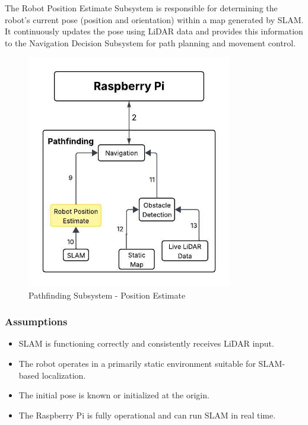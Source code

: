 The Robot Position Estimate Subsystem is responsible for determining the robot's current pose (position and orientation) within a map generated by SLAM. It continuously updates the pose using LiDAR data and provides this information to the Navigation Decision Subsystem for path planning and movement control.

\begin{figure}[h!]
	\centering
 	\includegraphics[width=0.80\textwidth]{images/pathfinding 2/Data_Flow_RobotPosition.jpeg}
 	\caption{Pathfinding Subsystem - Position Estimate}
\end{figure}

\subsubsection{Assumptions}

\begin{itemize}
    \item SLAM is functioning correctly and consistently receives LiDAR input.
    \item The robot operates in a primarily static environment suitable for SLAM-based localization.
    \item The initial pose is known or initialized at the origin.
    \item The Raspberry Pi is fully operational and can run SLAM in real time.
\end{itemize}

